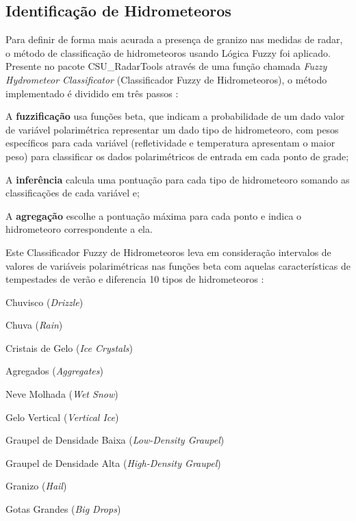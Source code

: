 \subsection{Identificação de Hidrometeoros}\label{hid}

Para definir de forma mais acurada a presença de granizo nas medidas de radar, o método de classificação de hidrometeoros usando Lógica Fuzzy foi aplicado. Presente no pacote CSU\_RadarTools \cite{Lang2017a} através de uma função chamada \textit{Fuzzy Hydrometeor Classificator} (Classificador Fuzzy de Hidrometeoros), o método implementado é dividido em três passos \cite{Liu2000a}:

\begin{alineas}
	\item A \textbf{fuzzificação} usa funções beta, que indicam a probabilidade de um dado valor de variável polarimétrica representar um dado tipo de hidrometeoro, com pesos específicos para cada variável (refletividade e temperatura apresentam o maior peso) para classificar os dados polarimétricos de entrada em cada ponto de grade;
	\item A \textbf{inferência} calcula uma pontuação para cada tipo de hidrometeoro somando as classificações de cada variável e;
	\item A \textbf{agregação} escolhe a pontuação máxima para cada ponto e indica o hidrometeoro correspondente a ela.
\end{alineas}

Este Classificador Fuzzy de Hidrometeoros leva em consideração intervalos de valores de variáveis polarimétricas nas funções beta com aquelas características de tempestades de verão e diferencia 10 tipos de hidrometeoros \cite{Lang2017a}:

\begin{alineas}
	\item Chuvisco (\textit{Drizzle})
	\item Chuva (\textit{Rain})
	\item Cristais de Gelo (\textit{Ice Crystals})
	\item Agregados (\textit{Aggregates})
	\item Neve Molhada (\textit{Wet Snow})
	\item Gelo Vertical (\textit{Vertical Ice})
	\item Graupel de Densidade Baixa (\textit{Low-Density Graupel})
	\item Graupel de Densidade Alta (\textit{High-Density Graupel})
	\item Granizo (\textit{Hail})
	\item Gotas Grandes (\textit{Big Drops})
\end{alineas}

